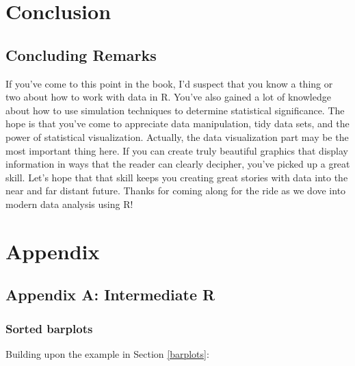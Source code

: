 \documentclass[]{tufte-book}
\newenvironment{Shaded}{\begin{snugshade}}{\end{snugshade}}
\newcommand{\KeywordTok}[1]{\textcolor[rgb]{0.13,0.29,0.53}{\textbf{{#1}}}}
\newcommand{\StringTok}[1]{\textcolor[rgb]{0.31,0.60,0.02}{{#1}}}
\newcommand{\NormalTok}[1]{{#1}}
\begin{document}
\part{Conclusion}\label{part-conclusion}


\chapter{Concluding Remarks}\label{conclusion}

If you've come to this point in the book, I'd suspect that you know a
thing or two about how to work with data in R. You've also gained a lot
of knowledge about how to use simulation techniques to determine
statistical significance. The hope is that you've come to appreciate
data manipulation, tidy data sets, and the power of statistical
visualization. Actually, the data visualization part may be the most
important thing here. If you can create truly beautiful graphics that
display information in ways that the reader can clearly decipher, you've
picked up a great skill. Let's hope that that skill keeps you creating
great stories with data into the near and far distant future. Thanks for
coming along for the ride as we dove into modern data analysis using R!

\part{Appendix}\label{part-appendix}


\chapter{Appendix A: Intermediate R}\label{appendix1}

\section{Sorted barplots}\label{sorted-barplots}

Building upon the example in Section \ref{barplots}:

\begin{Shaded}
\end{Shaded}
\end{document}
